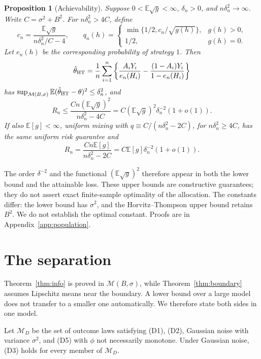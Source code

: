 \documentclass[12pt]{article}
\newtheorem{proposition}{Proposition}
\theoremstyle{definition}
\theoremstyle{remark}
\newcommand{\E}{\mathbb{E}}
\newcommand{\M}{\mathcal{M}}
\begin{document}
\begin{proposition}[Achievability]\label{prop:achieve}
Suppose $0<\E\sqrt g<\infty$, $\delta_n>0$, and $n\delta_n^2\to\infty$. Write
$C=\sigma^2+B^2$. For $n\delta_n^2>4C$, define
\begin{equation}\label{eq:allocation}
 c_n=\frac{\E\sqrt g}{n\delta_n^2/C-4},\qquad
 q_n(h)=\begin{cases}
 \min\{1/2,c_n/\sqrt{g(h)}\},&g(h)>0,\\
 1/2,&g(h)=0.
 \end{cases}
\end{equation}
Let $e_n(h)$ be the corresponding probability of strategy $1$. Then
\begin{equation}\label{eq:ht}
 \hat\theta_{\rm HT}=\frac1n\sum_{i=1}^n
 \left\{\frac{A_iY_i}{e_n(H_i)}-
 \frac{(1-A_i)Y_i}{1-e_n(H_i)}\right\}
\end{equation}
has $\sup_{\M(B,\sigma)}\E(\hat\theta_{\rm HT}-\theta)^2\le\delta_n^2$, and
\[
 R_n\le\frac{Cn(\E\sqrt g)^2}{n\delta_n^2-4C}
      =C(\E\sqrt g)^2\delta_n^{-2}(1+o(1)).
\]
If also $\E[g]<\infty$, uniform mixing with
$q\equiv C/(n\delta_n^2-2C)$, for $n\delta_n^2\ge4C$, has the same uniform
risk guarantee and
\[
 R_n=\frac{Cn\E[g]}{n\delta_n^2-2C}
    =C\E[g]\delta_n^{-2}(1+o(1)).
\]
\end{proposition}

The order $\delta^{-2}$ and the functional $(\E\sqrt g)^2$ therefore appear in
both the lower bound and the attainable loss. These upper bounds are constructive guarantees;
they do not assert exact finite-sample optimality of the allocation.
The constants differ: the lower
bound has $\sigma^2$, and the Horvitz--Thompson upper bound retains $B^2$. We
do not establish the optimal constant. Proofs are in Appendix~\ref{app:population}.

\section{The separation}\label{sec:separation}

Theorem~\ref{thm:info} is proved in $\M(B,\sigma)$, while
Theorem~\ref{thm:boundary} assumes Lipschitz means near the boundary. A lower
bound over a large model does not transfer to a smaller one automatically. We
therefore state both sides in one model.

Let $\M_D$ be the set of outcome laws satisfying (D1), (D2), Gaussian noise
with variance $\sigma^2$, and (D5) with $\phi$ not necessarily monotone. Under
Gaussian noise, (D3) holds for every member of $\M_D$.
\end{document}
